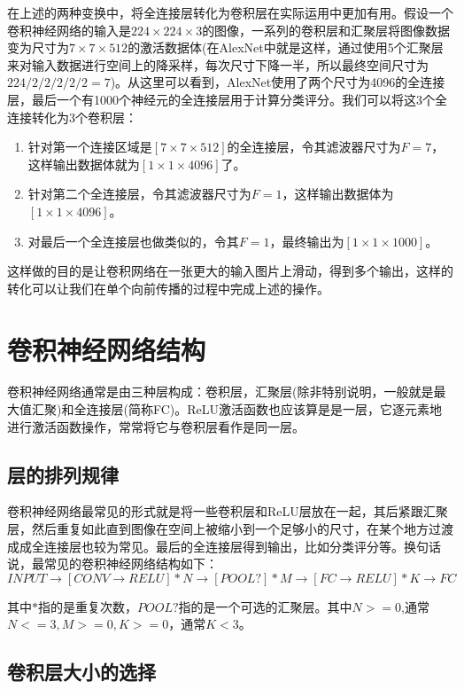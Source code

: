 \documentclass[UTF-8, a4paper, 12pt]{ctexart}
\begin{document}
在上述的两种变换中，将全连接层转化为卷积层在实际运用中更加有用。假设一个卷积神经网络的输入是$224\times 224\times 3$的图像，一系列的卷积层和汇聚层将图像数据变为尺寸为$7\times 7\times 512$的激活数据体(在AlexNet中就是这样，通过使用5个汇聚层来对输入数据进行空间上的降采样，每次尺寸下降一半，所以最终空间尺寸为$224/2/2/2/2/2=7$)。从这里可以看到，AlexNet使用了两个尺寸为4096的全连接层，最后一个有1000个神经元的全连接层用于计算分类评分。我们可以将这3个全连接转化为3个卷积层：
\begin{enumerate}
    \item 针对第一个连接区域是$[7\times 7\times 512]$的全连接层，令其滤波器尺寸为$F=7$，这样输出数据体就为$[1\times 1\times 4096]$了。
    \item  针对第二个全连接层，令其滤波器尺寸为$F=1$，这样输出数据体为$[1\times 1\times 4096]$。
    \item 对最后一个全连接层也做类似的，令其$F=1$，最终输出为$[1\times 1\times 1000]$。
\end{enumerate}

这样做的目的是让卷积网络在一张更大的输入图片上滑动，得到多个输出，这样的转化可以让我们在单个向前传播的过程中完成上述的操作。

\section{卷积神经网络结构}
卷积神经网络通常是由三种层构成：卷积层，汇聚层(除非特别说明，一般就是最大值汇聚)和全连接层(简称FC)。ReLU激活函数也应该算是是一层，它逐元素地进行激活函数操作，常常将它与卷积层看作是同一层。

\subsection{层的排列规律}
卷积神经网络最常见的形式就是将一些卷积层和ReLU层放在一起，其后紧跟汇聚层，然后重复如此直到图像在空间上被缩小到一个足够小的尺寸，在某个地方过渡成成全连接层也较为常见。最后的全连接层得到输出，比如分类评分等。换句话说，最常见的卷积神经网络结构如下：
$$ INPUT\rightarrow[CONV\rightarrow RELU]*N\rightarrow [POOL?]*M\rightarrow[FC\rightarrow RELU]*K\rightarrow FC$$

其中$*$指的是重复次数，$POOL?$指的是一个可选的汇聚层。其中$N >=0$,通常$N<=3,M>=0,K>=0$，通常$K<3$。
\subsection{卷积层大小的选择}
\end{document}
